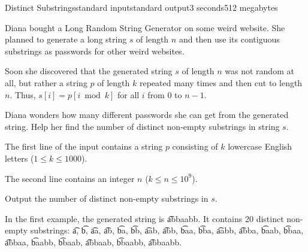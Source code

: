 \begin{problem}{Distinct Substrings}{standard input}{standard output}{3 seconds}{512 megabytes}

Diana bought a Long Random String Generator on some weird website. She planned to generate a long string $s$ of length $n$ and then use its contiguous substrings as passwords for other weird websites.

Soon she discovered that the generated string $s$ of length $n$ was not random at all, but rather a string $p$ of length $k$ repeated many times and then cut to length $n$. Thus, $s[i] = p[i \bmod k]$ for all $i$ from $0$ to $n-1$.

Diana wonders how many different passwords she can get from the generated string. Help her find the number of distinct non-empty substrings in string $s$.


\InputFile
The first line of the input contains a string $p$ consisting of $k$ lowercase English letters ($1\le k\le 1000$).

The second line contains an integer $n$ ($k\le n\le 10^9$).

\OutputFile
Output the number of distinct non-empty substrings in $s$.

\Examples

\begin{example}
%
%
\end{example}

\Note
In the first example, the generated string is \t{abbaabb}. It contains 20 distinct non-empty substrings: \t{a}, \t{b}, \t{aa}, \t{ab}, \t{ba}, \t{bb}, \t{aab}, \t{abb}, \t{baa}, \t{bba}, \t{aabb}, \t{abba}, \t{baab}, \t{bbaa}, \t{abbaa}, \t{baabb}, \t{bbaab}, \t{abbaab}, \t{bbaabb}, \t{abbaabb}.


\end{problem}

